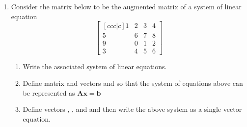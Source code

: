 \documentclass[basic]{inVerba-notes}
\begin{document}
\begin{enumerate}\color{minor}
  \item Consider the matrix below to be the augmented matrix of a system of linear equation
  \[%
  \begin{bmatrix}[ccc|c]
  1 & 2 & 3 & 4 \\
  5 & 6 & 7 & 8 \\
  9 & 0 & 1 & 2 \\
  3 & 4 & 5 & 6
  \end{bmatrix}
  \]%
  \begin{enumerate}
    \item Write the associated system of linear equations.
    \basec{\[%
    \begin{cases}
    1x_1+2x_2+3x_3 = 4 \\
    5x_1+6x_2+7x_3 = 8 \\
    9x_1+0x_2+1x_3 = 2 \\
    3x_1+4x_2+5x_3 = 6 
    \end{cases}
    \]}%
    \item Define matrix  and vectors  and  so that the system of equations above can be represented as \(\bm{Ax}=\bm{b}\) 
    \basec{\[%
    \bm{A}=\begin{bmatrix}
    1 & 2 & 3 \\
    5 & 6 & 7 \\
    9 & 0 & 1 \\
    3 & 4 & 5
    \end{bmatrix}
    \quad
    \bm{x}=\begin{bmatrix}
    x_1 \\ x_2 \\ x_3 
    \end{bmatrix}
    \quad 
    \bm{b}=\begin{bmatrix}
    4 \\ 8 \\ 2 \\ 6 
    \end{bmatrix}
    \]}%
    \item Define vectors , , and  and then write the above system as a single vector equation.
    \basec{\[%
    \bm{a_1} = \begin{bmatrix} 1 \\ 5 \\ 9 \\ 3 \end{bmatrix}\quad
\]}
\end{enumerate}
\end{enumerate}
\end{document}
